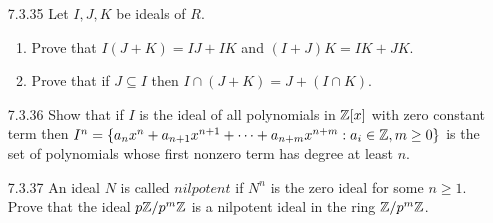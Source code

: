 \begin{enumerate}
   \item[7.3.35]  Let $I, J, K$ be ideals of $R$.
                  \begin{enumerate}
                     \item Prove that $I(J + K) = IJ + IK$ and
                           $(I + J)K = IK + JK$.
                     \item Prove that if $J \subseteq I$ then
                           $I \cap (J + K) = J + (I \cap K)$.
                  \end{enumerate}
   \item[7.3.36]  Show that if $I$ is the ideal of all polynomials in $\mathbb{Z}[x]$
                  with zero constant term then $I^n = \{a_nx^n + a_{n+1}x^{n+1} 
                  + \cdots + a_{n+m}x^{n+m} : a_i \in \mathbb{Z}, m \ge 0\}$ is the set
                  of polynomials whose first nonzero term has degree at least
                  $n$.
   \item[7.3.37]  An ideal $N$ is called $\textit{nilpotent}$ if $N^n$ is the
                  zero ideal for some $n \ge 1$. Prove that the ideal
                  $p\mathbb{Z}/p^m\mathbb{Z}$ is a nilpotent ideal in the ring $\mathbb{Z}/p^m\mathbb{Z}$.
\end{enumerate}
